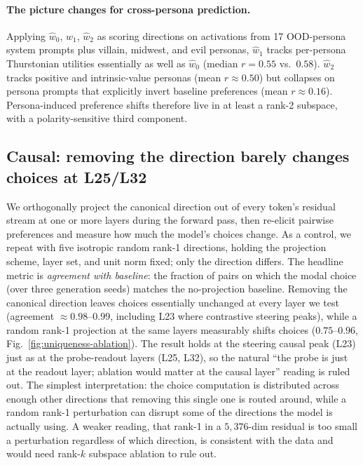 \documentclass{article}
\begin{document}
\paragraph{The picture changes for cross-persona prediction.} Applying $\hat{w}_0$, $\hat{w}_1$, $\hat{w}_2$ as scoring directions on activations from 17 OOD-persona system prompts plus villain, midwest, and evil personas, $\hat{w}_1$ tracks per-persona Thurstonian utilities essentially as well as $\hat{w}_0$ (median $r = 0.55$ vs.\ $0.58$). $\hat{w}_2$ tracks positive and intrinsic-value personas (mean $r \approx 0.50$) but collapses on persona prompts that explicitly invert baseline preferences (mean $r \approx 0.16$). Persona-induced preference shifts therefore live in at least a rank-2 subspace, with a polarity-sensitive third component.

\subsection{Causal: removing the direction barely changes choices at L25/L32}
\label{app:probe-uniqueness-ablation}

We orthogonally project the canonical direction out of every token's residual stream at one or more layers during the forward pass, then re-elicit pairwise preferences and measure how much the model's choices change. As a control, we repeat with five isotropic random rank-1 directions, holding the projection scheme, layer set, and unit norm fixed; only the direction differs. The headline metric is \emph{agreement with baseline}: the fraction of pairs on which the modal choice (over three generation seeds) matches the no-projection baseline. Removing the canonical direction leaves choices essentially unchanged at every layer we test (agreement $\approx 0.98$--$0.99$, including L23 where contrastive steering peaks), while a random rank-1 projection at the same layers measurably shifts choices ($0.75$--$0.96$, Fig.~\ref{fig:uniqueness-ablation}). The result holds at the steering causal peak (L23) just as at the probe-readout layers (L25, L32), so the natural ``the probe is just at the readout layer; ablation would matter at the causal layer'' reading is ruled out. The simplest interpretation: the choice computation is distributed across enough other directions that removing this single one is routed around, while a random rank-1 perturbation can disrupt some of the directions the model is actually using. A weaker reading, that rank-1 in a $5{,}376$-dim residual is too small a perturbation regardless of which direction, is consistent with the data and would need rank-$k$ subspace ablation to rule out.
\end{document}
